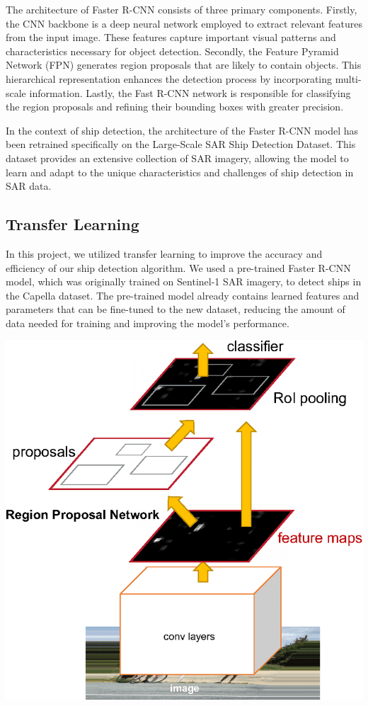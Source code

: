 \begin{sloppypar}
The architecture of Faster R-CNN consists of three primary components. Firstly, the CNN backbone is a deep neural network employed to extract relevant features from the input image. These features capture important visual patterns and characteristics necessary for object detection. Secondly, the Feature Pyramid Network (FPN) generates region proposals that are likely to contain objects. This hierarchical representation enhances the detection process by incorporating multi-scale information. Lastly, the Fast R-CNN network is responsible for classifying the region proposals and refining their bounding boxes with greater precision.

In the context of ship detection, the architecture of the Faster R-CNN model has been retrained specifically on the Large-Scale SAR Ship Detection Dataset. This dataset provides an extensive collection of SAR imagery, allowing the model to learn and adapt to the unique characteristics and challenges of ship detection in SAR data.

\subsection{Transfer Learning}

In this project, we utilized transfer learning to improve the accuracy and efficiency of our ship detection algorithm. We used a pre-trained Faster R-CNN model, which was originally trained on Sentinel-1 SAR imagery, to detect ships in the Capella dataset. The pre-trained model already contains learned features and parameters that can be fine-tuned to the new dataset, reducing the amount of data needed for training and improving the model's performance. 

\begin{center}
    \includegraphics[scale=0.3]{images/36ba437e-08e4-4495-81e9-6487397216c7.png}   
\end{center}


\end{sloppypar}
